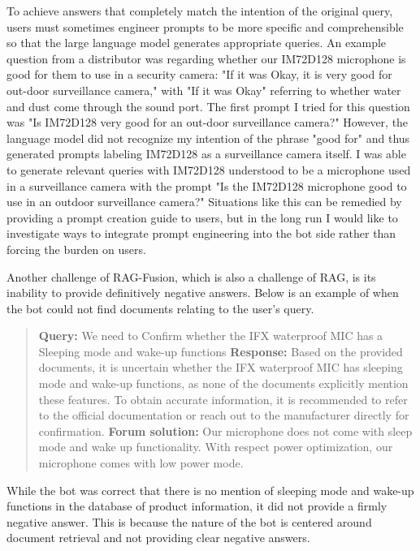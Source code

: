 \documentclass{article}
\begin{document}
To achieve answers that completely match the intention of the original query, users must sometimes engineer prompts to be more specific and comprehensible so that the large language model generates appropriate queries. An example question from a distributor was regarding whether our IM72D128 microphone is good for them to use in a security camera: "If it was  Okay, it is very good for out-door surveillance camera," with "If it was Okay" referring to whether water and dust come through the sound port. The first prompt I tried for this question was "Is IM72D128 very good for an out-door surveillance camera?" However, the language model did not recognize my intention of the phrase "good for" and thus generated prompts labeling IM72D128 as a surveillance camera itself. I was able to generate relevant queries with IM72D128 understood to be a microphone used in a surveillance camera with the prompt "Is the IM72D128 microphone good to use in an outdoor surveillance camera?" Situations like this can be remedied by providing a prompt creation guide to users, but in the long run I would like to investigate ways to integrate prompt engineering into the bot side rather than forcing the burden on users.

Another challenge of RAG-Fusion, which is also a challenge of RAG, is its inability to provide definitively negative answers. Below is an example of when the bot could not find documents relating to the user's query. 

\begin{quote}
\textbf{Query:} We need to Confirm whether the IFX waterproof MIC has a Sleeping mode and wake-up functions \newline
\textbf{Response:} Based on the provided documents, it is uncertain whether the IFX waterproof MIC has sleeping mode and wake-up functions, as none of the documents explicitly mention these features. To obtain accurate information, it is recommended to refer to the official documentation or reach out to the manufacturer directly for confirmation. \newline
\textbf{Forum solution:} Our microphone does not come with sleep mode and wake up functionality.
With respect power optimization, our microphone comes with low power mode.
\end{quote}

While the bot was correct that there is no mention of sleeping mode and wake-up functions in the database of product information, it did not provide a firmly negative answer. This is because the nature of the bot is centered around document retrieval and not providing clear negative answers.
\end{document}
